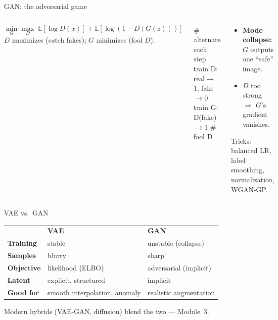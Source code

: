 \documentclass[
11pt,notheorems,hyperref={pdfauthor=whatever}
]{beamer}
\begin{document}
\begin{frame}{GAN: the adversarial game}
\small
\begin{columns}[c,onlytextwidth]
    \begin{tcolorbox}[medicalglass, title=\textbf{\color{accAmber}Minimax objective}]
    \[
    \min_G \max_D \;
    \mathbb{E}[\log D(x)] + \mathbb{E}[\log(1-D(G(z)))]
    \]
    $D$ maximizes (catch fakes); $G$ minimizes (fool $D$).
    \end{tcolorbox}
    \begin{tcolorbox}[colback=black, colframe=accAmber!60!black, coltext=white,
        arc=3pt, boxrule=1pt, fontupper=\scriptsize\ttfamily]
    \# alternate each step\\
    train D: real$\to$1, fake$\to$0\\
    train G: D(fake)$\to$1  \# fool D
    \end{tcolorbox}

    \begin{tcolorbox}[medicalglass, title=\textbf{\color{accCoral}It's unstable}]
    \begin{itemize}\small\setlength\itemsep{0.35em}
        \item \textbf{Mode collapse:} $G$ outputs one ``safe'' image.
        \item $D$ too strong $\Rightarrow$ $G$'s gradient vanishes.
    \end{itemize}
    {\scriptsize Tricks: balanced LR, label smoothing, normalization, WGAN-GP.}
    \end{tcolorbox}
\end{columns}
\end{frame}

\begin{frame}{VAE vs.\ GAN}
\small
\centering
\vspace{0.2cm}
\begin{tcolorbox}[medicalglass, width=0.95\linewidth]
\renewcommand{\arraystretch}{1.4}
\begin{tabular}{@{}p{3.2cm}p{3.2cm}p{3.2cm}@{}}
 & \textcolor{accTeal}{\textbf{VAE}} & \textcolor{accAmber}{\textbf{GAN}}\\
\textbf{Training} & stable & unstable (collapse)\\
\textbf{Samples} & blurry & sharp\\
\textbf{Objective} & likelihood (ELBO) & adversarial (implicit)\\
\textbf{Latent} & explicit, structured & implicit\\
\textbf{Good for} & smooth interpolation, anomaly & realistic augmentation\\
\end{tabular}
\end{tcolorbox}

\vspace{0.4cm}
{\footnotesize \textcolor{gray!55}{Modern hybrids (VAE-GAN, diffusion) blend the two --- Module~3.}}
\end{frame}
\end{document}
